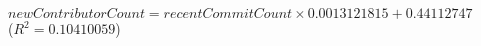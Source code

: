 $\mathit{newContributorCount} = \mathit{recentCommitCount} \times 0.0013121815 + 0.44112747$\\($R^2 = 0.10410059$)